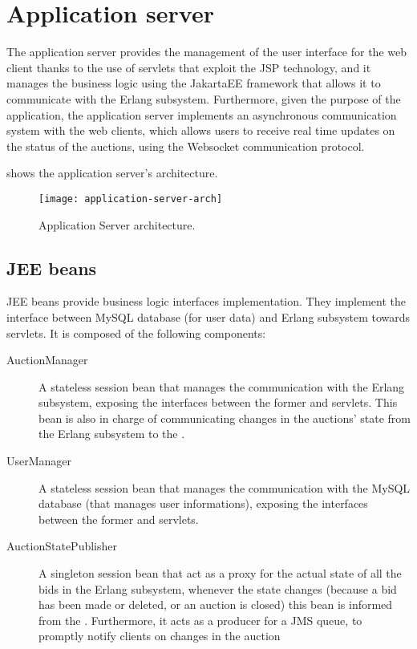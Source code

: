 \section{Application server}\label{sec:archserver}

The application server provides the management of the user interface for the web
client thanks to the use of servlets that exploit the JSP technology, and it
manages the business logic using the JakartaEE framework that allows it to
communicate with the Erlang subsystem. Furthermore, given the purpose of the
application, the application server implements an asynchronous communication
system with the web clients, which allows users to receive real time updates on
the status of the auctions, using the Websocket communication protocol.

 shows the application server's
architecture.

\begin{figure}[htb]
	\centering
	\texttt{[image: application-server-arch]}
	\caption{Application Server
	architecture.}\label{fig:application-server-arch}
\end{figure}

\subsection{JEE beans}

JEE beans provide business logic interfaces implementation. They implement the
interface between MySQL database (for user data) and Erlang subsystem towards
servlets. It is composed of the following components:

\begin{description}
	\item[AuctionManager] A stateless session bean that manages the
		communication with the Erlang subsystem, exposing the interfaces
		between the former and servlets. This bean is also in charge of
		communicating changes in the auctions’ state from the Erlang
		subsystem to the .
	\item[UserManager] A stateless session bean that manages the
		communication with the MySQL database (that manages user
		informations), exposing the interfaces between the former and
		servlets.
	\item[AuctionStatePublisher] A singleton session bean that act as a
		proxy for the actual state of all the bids in the Erlang
		subsystem, whenever the state changes (because a bid has been
		made or deleted, or an auction is closed) this bean is informed
		from the . Furthermore, it acts as a
		producer for a JMS queue, to promptly notify clients on changes
		in the auction
\end{description}

